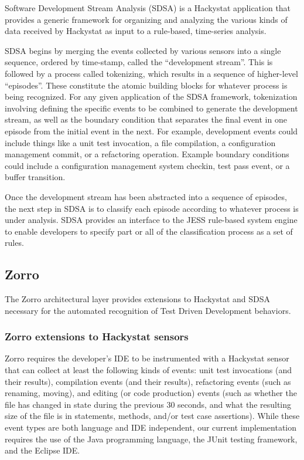 \documentclass[11pt,twocolumn]{article}
\begin{document}
Software Development Stream Analysis (SDSA) is a Hackystat application that
provides a generic framework for organizing and analyzing the various kinds
of data received by Hackystat as input to a rule-based, time-series
analysis.

SDSA begins by merging the events collected by various sensors into a single sequence, 
ordered by time-stamp, called the ``development stream''.  
This is followed by a process called tokenizing, which results in a 
sequence of higher-level ``episodes''.  These 
constitute the atomic building blocks for whatever process is being
recognized.  For any given application of the SDSA framework, tokenization
involving defining the specific events to be combined to generate the
development stream, as well as the boundary condition that separates the
final event in one episode from the initial event in the next. For example, 
development events could include things like a unit test invocation, a file compilation, a
configuration management commit, or a refactoring operation.  Example
boundary conditions could include a configuration management system checkin, test
pass event, or a buffer transition.

Once the development stream has been abstracted into a sequence of
episodes, the next step in SDSA is to classify each episode according to
whatever process is under analysis.  SDSA provides an interface to the JESS
rule-based system engine to enable developers to specify part or all of the
classification process as a set of rules.

\subsection{Zorro}

The Zorro architectural layer provides extensions to Hackystat and SDSA
necessary for the automated recognition of Test Driven Development
behaviors.

\subsubsection{Zorro extensions to Hackystat sensors}

Zorro requires the developer's IDE to be instrumented with a Hackystat
sensor that can collect at least the following kinds of events: unit test
invocations (and their results), compilation events (and their results),
refactoring events (such as renaming, moving), and editing (or code
production) events (such as whether the file has changed in state during
the previous 30 seconds, and what the resulting size of the file is in
statements, methods, and/or test case assertions).  While these event types
are both language and IDE independent, our current implementation requires
the use of the Java programming language, the JUnit testing framework, and
the Eclipse IDE.
\end{document}
